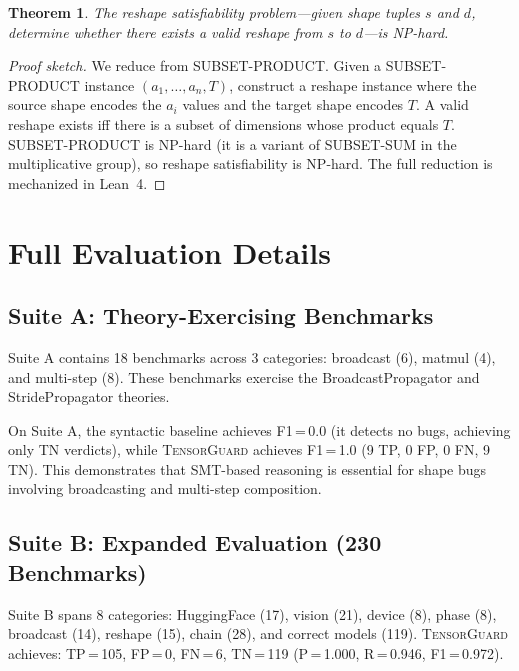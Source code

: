 \documentclass[11pt]{article}
\newtheorem{theorem}{Theorem}
\begin{document}
\begin{theorem}
The reshape satisfiability problem---given shape tuples $s$ and $d$,
determine whether there exists a valid reshape from $s$ to $d$---is
NP-hard.
\end{theorem}

\begin{proof}[Proof sketch]
We reduce from SUBSET-PRODUCT.  Given a SUBSET-PRODUCT instance
$(a_1, \ldots, a_n, T)$, construct a reshape instance where the
source shape encodes the $a_i$ values and the target shape encodes
$T$.  A valid reshape exists iff there is a subset of dimensions
whose product equals $T$.  SUBSET-PRODUCT is NP-hard (it is a
variant of SUBSET-SUM in the multiplicative group), so reshape
satisfiability is NP-hard.  The full reduction is mechanized in
Lean~4.
\end{proof}


\section{Full Evaluation Details}\label{app:eval-details}

\subsection{Suite A: Theory-Exercising Benchmarks}\label{sec:suite-a}

Suite A contains 18 benchmarks across 3 categories: broadcast (6),
matmul (4), and multi-step (8).  These benchmarks exercise the
BroadcastPropagator and StridePropagator theories.

On Suite A, the syntactic baseline achieves F1\,=\,0.0 (it detects
no bugs, achieving only TN verdicts), while \textsc{TensorGuard}
achieves F1\,=\,1.0 (9 TP, 0 FP, 0 FN, 9 TN).  This
demonstrates that SMT-based reasoning is essential for shape bugs
involving broadcasting and multi-step composition.

\subsection{Suite B: Expanded Evaluation (230 Benchmarks)}

Suite B spans 8 categories: HuggingFace (17), vision (21),
device (8), phase (8), broadcast (14), reshape (15), chain (28),
and correct models (119).  \textsc{TensorGuard} achieves:
TP\,=\,105, FP\,=\,0, FN\,=\,6, TN\,=\,119
(P\,=\,1.000, R\,=\,0.946, F1\,=\,0.972).
\end{document}
